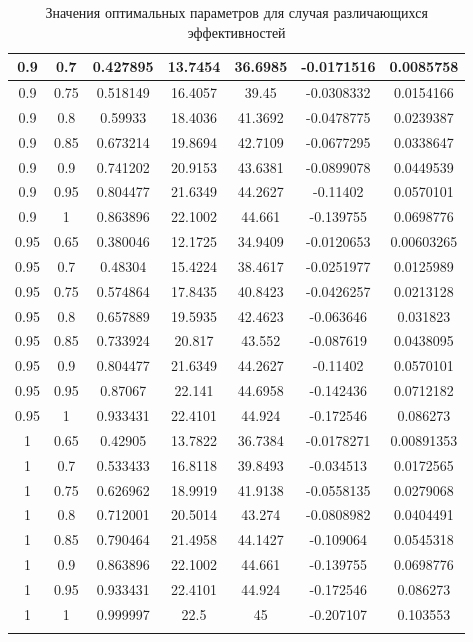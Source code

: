 \documentclass[%
master,         %
subf,           %
href,           %
colorlinks=true %
]{disser}
\numberwithin{equation}{section}
\numberwithin{figure}{section}
\begin{document}
\begin{longtable}{|c|c|c|c|c|c|c|}
0.9 & 0.7 & 0.427895 & 13.7454 & 36.6985 & -0.0171516 & 0.0085758\\\hline
0.9 & 0.75 & 0.518149 & 16.4057 & 39.45 & -0.0308332 & 0.0154166\\\hline
0.9 & 0.8 & 0.59933 & 18.4036 & 41.3692 & -0.0478775 & 0.0239387\\\hline
0.9 & 0.85 & 0.673214 & 19.8694 & 42.7109 & -0.0677295 & 0.0338647\\\hline
0.9 & 0.9 & 0.741202 & 20.9153 & 43.6381 & -0.0899078 & 0.0449539\\\hline
0.9 & 0.95 & 0.804477 & 21.6349 & 44.2627 & -0.11402 & 0.0570101\\\hline
0.9 & 1 & 0.863896 & 22.1002 & 44.661 & -0.139755 & 0.0698776\\\hline
0.95 & 0.65 & 0.380046 & 12.1725 & 34.9409 & -0.0120653 & 0.00603265\\\hline
0.95 & 0.7 & 0.48304 & 15.4224 & 38.4617 & -0.0251977 & 0.0125989\\\hline
0.95 & 0.75 & 0.574864 & 17.8435 & 40.8423 & -0.0426257 & 0.0213128\\\hline
0.95 & 0.8 & 0.657889 & 19.5935 & 42.4623 & -0.063646 & 0.031823\\\hline
0.95 & 0.85 & 0.733924 & 20.817 & 43.552 & -0.087619 & 0.0438095\\\hline
0.95 & 0.9 & 0.804477 & 21.6349 & 44.2627 & -0.11402 & 0.0570101\\\hline
0.95 & 0.95 & 0.87067 & 22.141 & 44.6958 & -0.142436 & 0.0712182\\\hline
0.95 & 1 & 0.933431 & 22.4101 & 44.924 & -0.172546 & 0.086273\\\hline
1 & 0.65 & 0.42905 & 13.7822 & 36.7384 & -0.0178271 & 0.00891353\\\hline
1 & 0.7 & 0.533433 & 16.8118 & 39.8493 & -0.034513 & 0.0172565\\\hline
1 & 0.75 & 0.626962 & 18.9919 & 41.9138 & -0.0558135 & 0.0279068\\\hline
1 & 0.8 & 0.712001 & 20.5014 & 43.274 & -0.0808982 & 0.0404491\\\hline
1 & 0.85 & 0.790464 & 21.4958 & 44.1427 & -0.109064 & 0.0545318\\\hline
1 & 0.9 & 0.863896 & 22.1002 & 44.661 & -0.139755 & 0.0698776\\\hline
1 & 0.95 & 0.933431 & 22.4101 & 44.924 & -0.172546 & 0.086273\\\hline
1 & 1 & 0.999997 & 22.5 & 45 & -0.207107 & 0.103553\\\hline
\caption{Значения оптимальных параметров для случая различающихся эффективностей}
\label{tab:different_etas}
\end{longtable}
\end{document}
